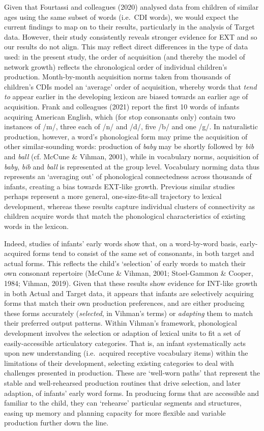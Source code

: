 \documentclass[
  man]{apa6}
\begin{document}
Given that Fourtassi and colleagues (2020) analysed data from children of similar ages using the same subset of words (i.e.~CDI words), we would expect the current findings to map on to their results, particularly in the analysis of Target data. However, their study consistently reveals stronger evidence for EXT and so our results do not align. This may reflect direct differences in the type of data used: in the present study, the order of acquisition (and thereby the model of network growth) reflects the chronological order of individual children's production. Month-by-month acquisition norms taken from thousands of children's CDIs model an `average' order of acquisition, whereby words that \emph{tend to} appear earlier in the developing lexicon are biased towards an earlier age of acquisition. Frank and colleagues (2021) report the first 10 words of infants acquiring American English, which (for stop consonants only) contain two instances of /m/, three each of /n/ and /d/, five /b/ and one /g/. In naturalistic production, however, a word's phonological form may prime the acquisition of other similar-sounding words: production of \emph{baby} may be shortly followed by \emph{bib} and \emph{ball} (cf. McCune \& Vihman, 2001), while in vocabulary norms, acquisition of \emph{baby}, \emph{bib} and \emph{ball} is represented at the group level. Vocabulary norming data thus represents an `averaging out' of phonological connectedness across thousands of infants, creating a bias towards EXT-like growth. Previous similar studies perhaps represent a more general, one-size-fits-all trajectory to lexical development, whereas these results capture individual clusters of connectivity as children acquire words that match the phonological characteristics of existing words in the lexicon.

Indeed, studies of infants' early words show that, on a word-by-word basis, early-acquired forms tend to consist of the same set of consonants, in both target and actual forms. This reflects the child's `selection' of early words to match their own consonant repertoire (McCune \& Vihman, 2001; Stoel-Gammon \& Cooper, 1984; Vihman, 2019). Given that these results show evidence for INT-like growth in both Actual and Target data, it appears that infants are selectively acquiring forms that match their own production preferences, and are either producing these forms accurately (\emph{selected}, in Vihman's terms) or \emph{adapting} them to match their preferred output patterns. Within Vihman's framework, phonological development involves the selection or adaption of lexical units to fit a set of easily-accessible articulatory categories. That is, an infant systematically acts upon new understanding (i.e.~acquired receptive vocabulary items) within the limitations of their development, selecting existing categories to deal with challenges presented in production. These are `well-worn paths' that represent the stable and well-rehearsed production routines that drive selection, and later adaption, of infants' early word forms. In producing forms that are accessible and familiar to the child, they can `rehearse' particular segments and structures, easing up memory and planning capacity for more flexible and variable production further down the line.
\end{document}
